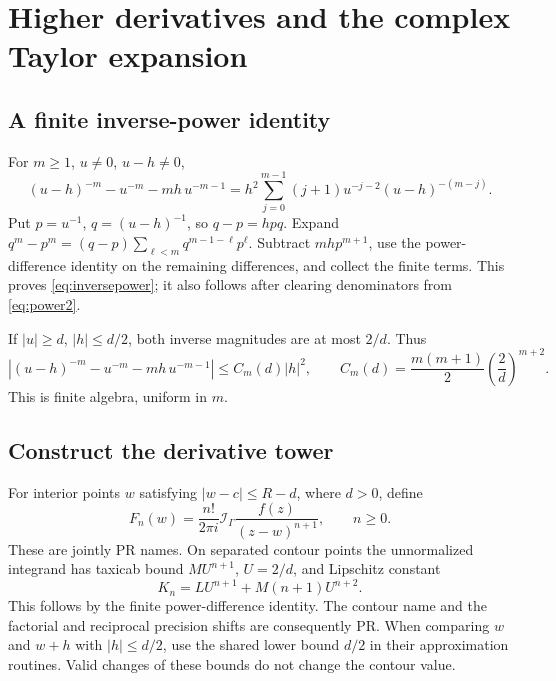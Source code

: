 \documentclass[11pt]{article}
\theoremstyle{definition}
\newcommand{\Int}{\mathcal I}
\begin{document}
\section{Higher derivatives and the complex Taylor expansion}\label{sec:analytic}

\subsection{A finite inverse-power identity}

For \(m\ge1\), \(u\ne0\), \(u-h\ne0\),
\begin{equation}\label{eq:inversepower}
 (u-h)^{-m}-u^{-m}-mh\,u^{-m-1}
 =h^2\sum_{j=0}^{m-1}(j+1)u^{-j-2}(u-h)^{-(m-j)}.
\end{equation}
Put \(p=u^{-1}\), \(q=(u-h)^{-1}\), so \(q-p=hpq\).
Expand \(q^m-p^m=(q-p)\sum_{\ell<m}q^{m-1-\ell}p^\ell\).
Subtract \(mh p^{m+1}\), use the power-difference identity on the
remaining differences, and collect the finite terms.
This proves \eqref{eq:inversepower}; it also follows after clearing
denominators from \eqref{eq:power2}.

If \(|u|\ge d\), \(|h|\le d/2\), both inverse magnitudes are at most \(2/d\).
Thus
\begin{equation}\label{eq:inversepowerbound}
 |(u-h)^{-m}-u^{-m}-mh\,u^{-m-1}|
 \le C_m(d)|h|^2,\qquad
 C_m(d)=\frac{m(m+1)}2\left(\frac2d\right)^{m+2}.
\end{equation}
This is finite algebra, uniform in \(m\).

\subsection{Construct the derivative tower}

For interior points \(w\) satisfying \(|w-c|\le R-d\), where \(d>0\), define
\begin{equation}\label{eq:Fn}
 F_n(w)=\frac{n!}{2\pi i}\Int_\Gamma
                  \frac{f(z)}{(z-w)^{n+1}},\qquad n\ge0.
\end{equation}
These are jointly PR names. On separated contour points the unnormalized
integrand has taxicab bound \(MU^{n+1}\), \(U=2/d\), and Lipschitz constant
\[
 K_n=LU^{n+1}+M(n+1)U^{n+2}.
\]
This follows by the finite power-difference identity. The contour name
and the factorial and reciprocal precision shifts are consequently PR.
When comparing \(w\) and \(w+h\) with \(|h|\le d/2\), use the shared
lower bound \(d/2\) in their approximation routines. Valid changes of
these bounds do not change the contour value.
\end{document}
